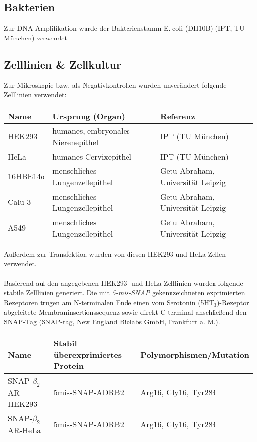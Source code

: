 \subsection{Bakterien}
Zur DNA-Amplifikation wurde der Bakterienstamm E. coli (DH10B) (IPT, TU München) verwendet.

\subsection{Zelllinien \& Zellkultur}
Zur Mikroskopie bzw. als Negativkontrollen wurden unverändert folgende Zelllinien verwendet:

\begin{table}[!htsp]
	\begin{tabularx}{\textwidth}{lll}
\toprule
Name		&	Ursprung (Organ)				&	Referenz\\
\midrule
HEK293		&	humanes, embryonales Nierenepithel		&	IPT (TU München)\\
HeLa		&	humanes Cervixepithel					&	IPT (TU München)\\
\midrule
16HBE14o		&	menschliches Lungenzellepithel			&	Getu Abraham, Universität Leipzig\\
Calu-3			&	menschliches Lungenzellepithel			&	Getu Abraham, Universität Leipzig\\
A549			&	menschliches Lungenzellepithel			&	Getu Abraham, Universität Leipzig\\
\bottomrule
\end{tabularx}
\end{table}

Außerdem zur Transfektion wurden von diesen HEK293 und HeLa-Zellen verwendet.
\\ \\
Basierend auf den angegebenen HEK293- und HeLa-Zelllinien wurden folgende stabile Zelllinien generiert. Die mit \textit{5-mis-SNAP} gekennzeichneten exprimierten Rezeptoren trugen am N-terminalen Ende einen vom Serotonin (5HT$_3$)-Rezeptor abgeleitete Membraninsertionssequenz sowie direkt C-terminal anschließend den SNAP-Tag (SNAP-tag, New England Biolabs GmbH, Frankfurt a. M.). 

\begin{table}[htsb]
\begin{tabularx}{\textwidth}{lll}
\toprule
Name		&	Stabil überexprimiertes Protein	&	Polymorphismen/Mutation\\
\midrule
SNAP-$\beta_2$AR-HEK293		&	5mis-SNAP-ADRB2		&	Arg16, Gly16, Tyr284\\
SNAP-$\beta_2$AR-HeLa		&	5mis-SNAP-ADRB2		&	Arg16, Gly16, Tyr284\\
\bottomrule
\end{tabularx}
\end{table}

